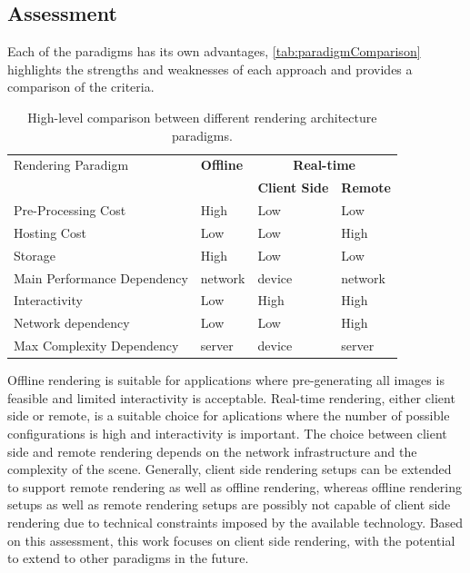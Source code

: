 \subsection*{Assessment}
\label{ch:paradigmAssessment}

Each of the paradigms has its own advantages, \autoref{tab:paradigmComparison} highlights the strengths and weaknesses of each approach and provides a comparison of the criteria.

\begin{table}[H]
  \centering
  \begin{tabular}{@{}p{5cm}p{2.5cm}p{2.5cm}p{2.5cm}@{}}
  \toprule
  Rendering Paradigm & \textbf{Offline} & \multicolumn{2}{c}{\textbf{Real-time}} \\
   &  & \textbf{Client Side} & \textbf{Remote} \\
  Pre-Processing Cost & High & Low & Low \\
  Hosting Cost & Low & Low & High \\
  Storage & High & Low & Low \\
  Main Performance Dependency & network & device & network \\
  Interactivity & Low & High & High \\
  Network dependency & Low & Low & High \\
  Max Complexity Dependency & server & device & server \\
  \bottomrule
  \end{tabular}
  \caption{High-level comparison between different rendering architecture paradigms.}
  \label{tab:paradigmComparison}
\end{table}

Offline rendering is suitable for applications where pre-generating all images is feasible and limited interactivity is acceptable. Real-time rendering, either client side or remote, is a suitable choice for aplications where the number of possible configurations is high and interactivity is important. The choice between client side and remote rendering depends on the network infrastructure and the complexity of the scene.
Generally, client side rendering setups can be extended to support remote rendering as well as offline rendering, whereas offline rendering setups as well as remote rendering setups are possibly not capable of client side rendering due to technical constraints imposed by the available technology. Based on this assessment, this work focuses on client side rendering, with the potential to extend to other paradigms in the future.

